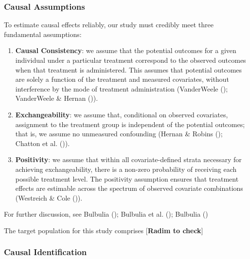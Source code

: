 \documentclass[
  single column]{article}
\begin{document}
\subsubsection{Causal Assumptions}\label{causal-assumptions}

To estimate causal effects reliably, our study must credibly meet three
fundamental assumptions:

\begin{enumerate}
\def\labelenumi{\arabic{enumi}.}
\item
  \textbf{Causal Consistency}: we assume that the potential outcomes for
  a given individual under a particular treatment correspond to the
  observed outcomes when that treatment is administered. This assumes
  that potential outcomes are solely a function of the treatment and
  measured covariates, without interference by the mode of treatment
  administration (VanderWeele ();
  VanderWeele \& Hernan ()).
\item
  \textbf{Exchangeability}: we assume that, conditional on observed
  covariates, assignment to the treatment group is independent of the
  potential outcomes; that is, we assume no unmeasured confounding
  (Hernan \& Robins (); Chatton et
  al. ()).
\item
  \textbf{Positivity}: we assume that within all covariate-defined
  strata necessary for achieving exchangeability, there is a non-zero
  probability of receiving each possible treatment level. The positivity
  assumption ensures that treatment effects are estimable across the
  spectrum of observed covariate combinations (Westreich \& Cole
  ()).
\end{enumerate}

For further discussion, see Bulbulia
(); Bulbulia et al.
(); Bulbulia
()

The target population for this study comprises {[}\textbf{Radim to
check}{]}

\subsubsection{Causal Identification}\label{causal-identification}
\end{document}
